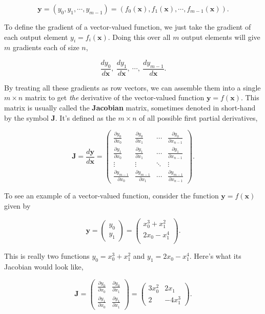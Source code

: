 \documentclass[
  letterpaper,
  DIV=11,
  numbers=noendperiod]{scrreprt}
\begin{document}
\[\mathbf{y} = (y_0,y_1,\cdots,y_{m-1}) = (f_0(\mathbf{x}),f_1(\mathbf{x}),\cdots,f_{m-1}(\mathbf{x})).\]

To define the gradient of a vector-valued function, we just take the
gradient of each output element \(y_i=f_i(\mathbf{x})\). Doing this over
all \(m\) output elements will give \(m\) gradients each of size \(n\),

\[\frac{dy_0}{d\mathbf{x}}, \ \frac{dy_1}{d\mathbf{x}}, \ \cdots, \ \frac{dy_{m-1}}{d\mathbf{x}}.\]

By treating all these gradients as row vectors, we can assemble them
into a single \(m \times n\) matrix to get \emph{the} derivative of the
vector-valued function \(\mathbf{y} = f(\mathbf{x})\). This matrix is
usually called the \textbf{Jacobian} matrix, sometimes denoted in
short-hand by the symbol \(\mathbf{J}\). It's defined as the
\(m \times n\) of all possible first partial derivatives,

\[
\mathbf{J} = \frac{d\mathbf{y}}{d\mathbf{x}} = 
\begin{pmatrix} 
\frac{\partial y_0}{\partial x_0} & \frac{\partial y_0}{\partial x_1} & \cdots & \frac{\partial y_0}{\partial x_{n-1}} \\ 
\frac{\partial y_1}{\partial x_0} & \frac{\partial y_1}{\partial x_1} & \cdots & \frac{\partial y_1}{\partial x_{n-1}} \\ 
\vdots & \vdots & \ddots & \vdots \\
\frac{\partial y_{m-1}}{\partial x_0} & \frac{\partial y_{m-1}}{\partial x_1} & \cdots & \frac{\partial y_{m-1}}{\partial x_{n-1}}
\end{pmatrix}.
\]

To see an example of a vector-valued function, consider the function
\(\mathbf{y} = f(\mathbf{x})\) given by

\[
\mathbf{y} = 
\begin{pmatrix} 
y_0 \\ 
y_1
\end{pmatrix} = 
\begin{pmatrix} 
x_0^3 + x_1^2 \\ 
2 x_0 - x_1^4 \\ 
\end{pmatrix}.
\]

This is really two functions \(y_0 = x_0^3 + x_1^2\) and
\(y_1 = 2 x_0 - x_1^4\). Here's what its Jacobian would look like,

\[
\mathbf{J} = 
\begin{pmatrix} 
\frac{\partial y_0}{\partial x_0} & \frac{\partial y_0}{\partial x_1} \\ 
\frac{\partial y_1}{\partial x_0} & \frac{\partial y_1}{\partial x_1}
\end{pmatrix} = 
\begin{pmatrix} 
3 x_0^2 & 2 x_1  \\ 
2 & -4 x_1^3
\end{pmatrix}.
\]
\end{document}
